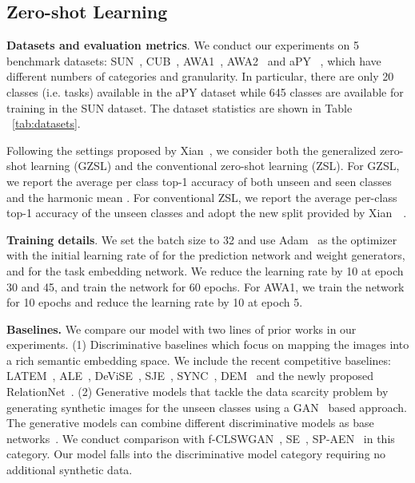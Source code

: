 \documentclass[10pt,twocolumn,letterpaper]{article}
\newcommand\minisection[1]{\vspace{2mm}\noindent \textbf{#1}}
\begin{document}
\subsection{Zero-shot Learning}
\label{sec:zeroshot}
\minisection{Datasets and evaluation metrics}. We conduct our experiments on 5 benchmark datasets:
SUN~\cite{xiao2010sun}, CUB~\cite{welinder2010caltech}, AWA1~\cite{lampert2009learning}, AWA2~\cite{xian2018zero} and aPY ~\cite{farhadi2009describing}, which have different numbers of categories and granularity. In particular, there are only 20 classes (i.e. tasks) available in the aPY dataset while 645 classes are available for training in the SUN dataset. The dataset statistics are shown in Table ~\ref{tab:datasets}.

Following the settings proposed by Xian~\etal, we consider both the generalized zero-shot learning (GZSL) and
the conventional zero-shot learning (ZSL). For GZSL, we report the average per class top-1 accuracy of both unseen  and seen classes  and the harmonic mean . For conventional ZSL, we report the average per-class top-1 accuracy of the unseen classes and adopt the new split provided by Xian~\etal~\cite{xian2018zero}.

\minisection{Training details}. We set the batch size to 32 and use Adam~\cite{kingma2014adam} as
the optimizer with the initial learning rate of  for the prediction network and weight generators, and  for the task embedding network. 
We reduce the learning rate by 10 at epoch 30 and 45, and
train the network for 60 epochs. For AWA1, we train the network for 10 epochs and reduce the learning rate by 10 at epoch 5. 

\minisection{Baselines.} We compare our model with two lines of prior works in our experiments. (1) Discriminative baselines which focus on mapping the images into a rich semantic embedding space. We include the recent 
competitive baselines: LATEM~\cite{zhang2016zero}, ALE~\cite{akata2016label},  DeViSE~\cite{frome2013devise}, 
SJE~\cite{akata2015evaluation}, SYNC~\cite{Changpinyo_2016_CVPR}, DEM~\cite{zhang2017learning} and the newly proposed RelationNet~\cite{yang2018learning}. (2) Generative models that tackle the data
scarcity problem by generating synthetic images for the unseen classes using a GAN~\cite{goodfellow2014generative, zhu2017unpaired} based approach. The generative models can combine different
discriminative models as base networks~\cite{xian2018feature,wang2018low}.
We conduct comparison with f-CLSWGAN~\cite{xian2018feature}, SE~\cite{verma2017generalized}, SP-AEN~\cite{chen2018zero} in this category. Our model falls into the discriminative model category requiring no additional 
synthetic data.
\end{document}
